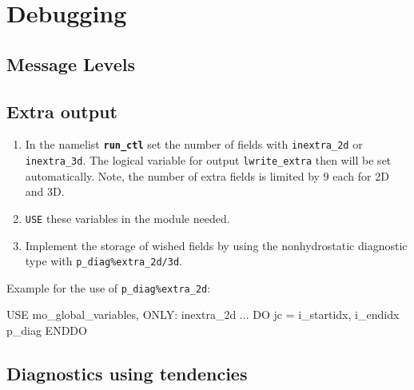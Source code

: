 \section{Debugging}

\subsection{Message Levels}

\subsection{Extra output}


\begin{enumerate} 
\item In the namelist {\bf \texttt{run\_ctl}} set the number of fields with \texttt{inextra\_2d} or
  \texttt{inextra\_3d}. The logical variable for output
  \texttt{lwrite\_extra} then will be set automatically. Note, the
  number of extra fields is limited by $9$ each for 2D and 3D.
\item  \texttt{USE} these variables in the module needed.
\item Implement the storage of wished fields by using the
  nonhydrostatic diagnostic type with
  \texttt{p\_diag\%extra\_2d/3d}. 
\end{enumerate} 

Example for the use of  \texttt{p\_diag\%extra\_2d}:  

\begin{fortran}  
  USE mo_global_variables, ONLY: inextra_2d
...
  DO jc = i_startidx, i_endidx
       p_diag%
  ENDDO
\end{fortran}  




\subsection{Diagnostics using tendencies}